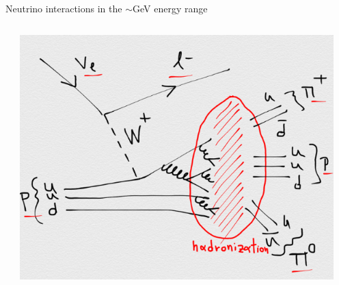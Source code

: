 \begin{frame}{Neutrino interactions in the $\sim$GeV energy range}
\begin{columns}
\begin{column}{0.33\textwidth}
  \end{column}
  \begin{column}{0.33\textwidth}
    \includegraphics[width=0.95\textwidth]{./images/nuint/feyn/dis.png}
  \end{column}
\end{columns}
\end{frame}



